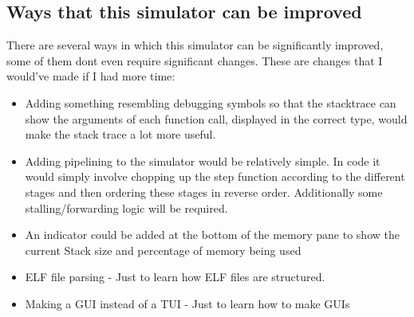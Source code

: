 \documentclass[12pt]{article}
\begin{document}
	\subsection{Ways that this simulator can be improved}

	There are several ways in which this simulator can be significantly improved, some of them dont even require significant changes. These are changes that I would've made if I had more time:

	\begin{itemize}
		\item Adding something resembling debugging symbols so that the stacktrace can show the arguments of each function call, displayed in the correct type, would make the stack trace a lot more useful.
		\item Adding pipelining to the simulator would be relatively simple. In code it would simply involve chopping up the step function according to the different stages and then ordering these stages in reverse order. Additionally some stalling/forwarding logic will be required.
		\item An indicator could be added at the bottom of the memory pane to show the current Stack size and percentage of memory being used
		\item ELF file parsing - Just to learn how ELF files are structured.
		\item Making a GUI instead of a TUI - Just to learn how to make GUIs
	\end{itemize}
\end{document}
